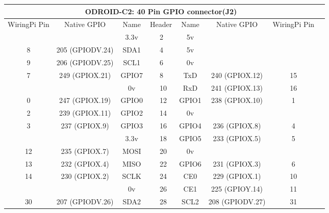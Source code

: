 \documentclass[11pt,a4paper]{article}
\begin{document}
\begin{sffamily}
\begin{center}
\begin{tabular}{|c|c|c||p{8mm}|p{8mm}||c|c|c|c|}
\hline
\multicolumn{8}{|c|}{\bfseries{ODROID-C2: 40 Pin GPIO connector(J2)}}\\
\hline
\hline
WiringPi Pin	& Native GPIO	& Name	& \multicolumn{2}{|c||}{Header}	& Name	& Native GPIO	& WiringPi Pin\\
\hline
\hline
	& 		& \textcolor{rtb-red}{3.3v}	& \raggedleft{1} &  2 & \textcolor{rtb-maroon}{5v}	& 		& \\
\hline
8	& 205 (GPIODV.24)	& \textcolor{rtb-aqua}{SDA1}	& \raggedleft{3} &  4 & \textcolor{rtb-maroon}{5v}		& 					& \\
\hline
9	& 206 (GPIODV.25)	& \textcolor{rtb-aqua}{SCL1}	& \raggedleft{5} &  6 & \textcolor{rtb-black}{0v}		& 					& \\
\hline
7	& 249 (GPIOX.21)	& \textcolor{rtb-green}{GPIO7}	& \raggedleft{7} &  8 & \textcolor{rtb-yellow}{TxD}		& 240 (GPIOX.12)	& 15\\
\hline
	&			 		& \textcolor{rtb-black}{0v}		& \raggedleft{9} & 10 & \textcolor{rtb-yellow}{RxD}		& 241 (GPIOX.13)	& 16\\
\hline
0	& 247 (GPIOX.19)	& \textcolor{rtb-green}{GPIO0}	& \raggedleft{11} & 12 & \textcolor{rtb-green}{GPIO1}	& 238 (GPIOX.10)	& 1\\
\hline
2	& 239 (GPIOX.11)	& \textcolor{rtb-green}{GPIO2}	& \raggedleft{13} & 14 & \textcolor{rtb-black}{0v}		& 					& \\
\hline
3	& 237 (GPIOX.9)		& \textcolor{rtb-green}{GPIO3}	& \raggedleft{15} & 16 & \textcolor{rtb-green}{GPIO4}	& 236 (GPIOX.8)		& 4\\
\hline
	& 					& \textcolor{rtb-red}{3.3v}		& \raggedleft{17} & 18 & \textcolor{rtb-green}{GPIO5}	& 233 (GPIOX.5)		& 5\\
\hline
12	& 235 (GPIOX.7)		& \textcolor{rtb-teal}{MOSI}	& \raggedleft{19} & 20 & \textcolor{rtb-black}{0v}		& 					& \\
\hline
13	& 232 (GPIOX.4)		& \textcolor{rtb-teal}{MISO}	& \raggedleft{21} & 22 & \textcolor{rtb-green}{GPIO6}	& 231 (GPIOX.3)		& 6\\
\hline
14	& 230 (GPIOX.2)		& \textcolor{rtb-teal}{SCLK}	& \raggedleft{23} & 24 & \textcolor{rtb-teal}{CE0}		& 229 (GPIOX.1)		& 10\\
\hline
	& 					& \textcolor{rtb-black}{0v}		& \raggedleft{25} & 26 & \textcolor{rtb-teal}{CE1}		& 225 (GPIOY.14)	& 11\\
\hline
30	& 207 (GPIODV.26)	& \textcolor{rtb-aqua}{SDA2}	& \raggedleft{27} & 28 & \textcolor{rtb-aqua}{SCL2}		& 208 (GPIODV.27)	& 31\\

\end{tabular}
\end{center}
\end{sffamily}
\end{document}
